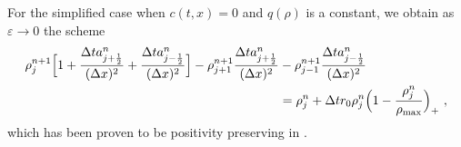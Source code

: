\documentclass[review,onefignum,onetabnum]{siamart220329}
\begin{document}
\begin{remark}
For the simplified case when $c(t,x)=0$ and $q(\rho)$ is a constant, we obtain as $\varepsilon \to 0$ the scheme 
\begin{align*}
    \rho_{j}^{n+1}\Bigl[1+\frac{\Delta ta_{j+\frac12}^n}{(\Delta x)^2}+\frac{\Delta ta_{j-\frac12}^n}{(\Delta x)^2}\Bigr] -\rho_{j+1}^{n+1}\frac{\Delta ta_{j+\frac12}^n}{(\Delta x)^2}&
    -\rho_{j-1}^{n+1}\frac{\Delta ta_{j-\frac12}^n}{(\Delta x)^2}\\
    &=\rho_j^n+\Delta tr_0\rho_j^n\Bigl(1-\frac{\rho_j^n}{\rho_{\textnormal{max}}} \Bigr)_+\ ,
\end{align*}
which has been proven to be positivity preserving in \cite{bailo2020fully}.
\end{remark}
\end{document}
